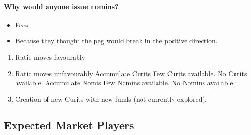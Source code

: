 \paragraph{Why would anyone issue nomins?}
\begin{itemize}
	\item Fees
	\item Because they thought the peg would break in the positive direction.
\end{itemize}

\begin{enumerate}
	\item Ratio moves favourably
	\item Ratio moves unfavourably
		\subitem Accumulate Curits
			\subsubitem Few Curits available.
			\subsubitem No Curits available.
		\subitem Accumulate Nomis
			\subsubitem Few Nomins available.
			\subsubitem No Nomins available.
	\item Creation of new Curits with new funds (not currently explored).
\end{enumerate}

\subsection{Expected Market Players}

